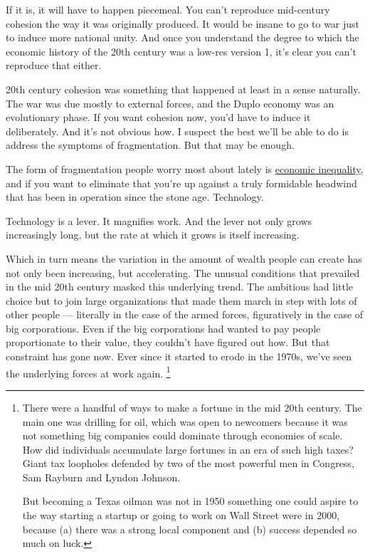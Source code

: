 If it is, it will have to happen piecemeal. You can't reproduce
mid-century cohesion the way it was originally produced. It would be
insane to go to war just to induce more national unity. And once you
understand the degree to which the economic history of the 20th century
was a low-res version 1, it's clear you can't reproduce that either.

20th century cohesion was something that happened at least in a sense
naturally. The war was due mostly to external forces, and the Duplo
economy was an evolutionary phase. If you want cohesion now, you'd have
to induce it deliberately. And it's not obvious how. I suspect the best
we'll be able to do is address the symptoms of fragmentation. But that
may be enough.

The form of fragmentation people worry most about lately is
\href{ineq.html}{economic inequality}, and if you want to eliminate that
you're up against a truly formidable headwind that has been in operation
since the stone age. Technology.

Technology is a lever. It magnifies work. And the lever not only grows
increasingly long, but the rate at which it grows is itself increasing.

Which in turn means the variation in the amount of wealth people can
create has not only been increasing, but accelerating. The unusual
conditions that prevailed in the mid 20th century masked this underlying
trend. The ambitious had little choice but to join large organizations
that made them march in step with lots of other people --- literally in
the case of the armed forces, figuratively in the case of big
corporations. Even if the big corporations had wanted to pay people
proportionate to their value, they couldn't have figured out how. But
that constraint has gone now. Ever since it started to erode in the
1970s, we've seen the underlying forces at work again.
\footnote{There were a handful of ways to make a fortune in the mid 20th
century. The main one was drilling for oil, which was open to newcomers
because it was not something big companies could dominate through
economies of scale. How did individuals accumulate large fortunes in an
era of such high taxes? Giant tax loopholes defended by two of the most
powerful men in Congress, Sam Rayburn and Lyndon Johnson.

But becoming a Texas oilman was not in 1950 something one could aspire
to the way starting a startup or going to work on Wall Street were in
2000, because (a) there was a strong local component and (b) success
depended so much on luck.}

